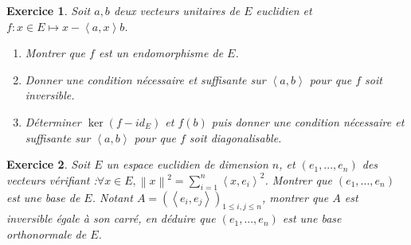 \documentclass[12pt,a4paper]{article}
\newcommand{\ps}[2]{\left\langle#1,#2\right\rangle}
\theoremstyle{break}
\newtheorem{Exo}{Exercice}
\begin{document}
\begin{Exo}
	Soit $a,b$ deux vecteurs unitaires de $E$ euclidien et $f:x\in E\mapsto x-\ps{a}{x}b$.
	\begin{enumerate}
		\item
		Montrer que $f$ est un endomorphisme de $E$.
		\item
				Donner une condition nécessaire et suffisante sur $\ps{a}{b}$ pour que $f$ soit inversible.
		\item
		Déterminer $\ker(f-id_E)$ et $f(b)$ puis donner une condition nécessaire et suffisante sur $\ps{a}{b}$ pour que $f$ soit diagonalisable.
	\end{enumerate}
\end{Exo}

\begin{Exo}
	Soit $ E  $ un espace euclidien de dimension $n$, et $ \left( e_{1},...,e_{n}\right)  $ des
	vecteurs  v\'{e}rifiant :$\forall x\in E,\left\| x\right\| ^{2}=\sum_{i=1}^{n}\left\langle
	x,e_{i}\right\rangle ^{2}$.
	Montrer que $ \left( e_{1},...,e_{n}\right) $  est une base  de $E$. Notant $A=\left(\ps{e_i}{e_j}\right)_{1\leqslant i,j \leqslant n}$, montrer que $A$ est inversible égale à son carré, en déduire que $ \left( e_{1},...,e_{n}\right) $  est une base orthonormale  de $E$. 
\end{Exo}
\end{document}
